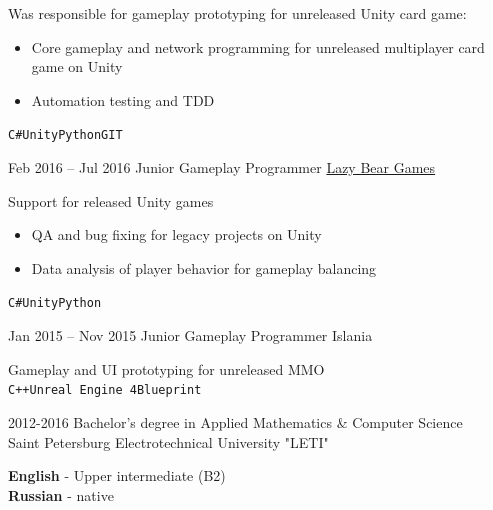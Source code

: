 \documentclass[9pt]{developercv} %
\begin{document}
\begin{entrylist}
{	Was responsible for gameplay prototyping for unreleased Unity card game:
	\begin{itemize}
		\item Core gameplay and network programming for unreleased multiplayer card game on Unity
		\item Automation testing and TDD
	\end{itemize}
	{\texttt{C\#}\slashsep\texttt{Unity}\slashsep\texttt{Python}\slashsep\texttt{GIT}}
	}
	\entry
	{Feb 2016 -- Jul 2016}
	{Junior Gameplay Programmer}
	{\href{http://lazybeargames.com/}{Lazy Bear Games}}
	{

	Support for released Unity games
	\begin{itemize}
		\item QA and bug fixing for legacy projects on Unity
		\item Data analysis of player behavior for gameplay balancing
	\end{itemize}
	{\texttt{C\#}\slashsep\texttt{Unity}\slashsep\texttt{Python}}
	}
	\entry
	{Jan 2015 -- Nov 2015}
	{Junior Gameplay Programmer}
	{Islania}
	{

	Gameplay and UI prototyping for unreleased MMO \\ {\texttt{C++}\slashsep\texttt{Unreal Engine 4}\slashsep\texttt{Blueprint}}
	}
\end{entrylist}



\begin{entrylist}
	\entry
	{2012-2016}
	{Bachelor's degree in Applied Mathematics \& Computer Science \\ \footnotesize{Saint Petersburg Electrotechnical University "LETI"} }
	{}
	{}
\end{entrylist}


\begin{minipage}[t]{0.5\textwidth}
	\vspace{-\baselineskip} %


	\textbf{English} - Upper intermediate (B2)\\
	\textbf{Russian} - native
\end{minipage}
\hfill

\end{document}
